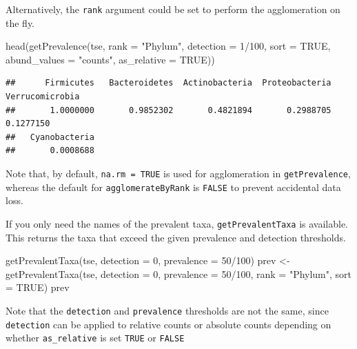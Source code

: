 \documentclass[
]{book}
\newenvironment{Shaded}{\begin{snugshade}}{\end{snugshade}}
\newcommand{\AttributeTok}[1]{\textcolor[rgb]{0.77,0.63,0.00}{#1}}
\newcommand{\ConstantTok}[1]{\textcolor[rgb]{0.00,0.00,0.00}{#1}}
\newcommand{\DecValTok}[1]{\textcolor[rgb]{0.00,0.00,0.81}{#1}}
\newcommand{\FunctionTok}[1]{\textcolor[rgb]{0.00,0.00,0.00}{#1}}
\newcommand{\NormalTok}[1]{#1}
\newcommand{\OtherTok}[1]{\textcolor[rgb]{0.56,0.35,0.01}{#1}}
\newcommand{\SpecialCharTok}[1]{\textcolor[rgb]{0.00,0.00,0.00}{#1}}
\newcommand{\StringTok}[1]{\textcolor[rgb]{0.31,0.60,0.02}{#1}}
\begin{document}
Alternatively, the \texttt{rank} argument could be set to perform the agglomeration on
the fly.

\begin{Shaded}
\begin{Highlighting}[]
\FunctionTok{head}\NormalTok{(}\FunctionTok{getPrevalence}\NormalTok{(tse, }\AttributeTok{rank =} \StringTok{"Phylum"}\NormalTok{, }\AttributeTok{detection =} \DecValTok{1}\SpecialCharTok{/}\DecValTok{100}\NormalTok{, }\AttributeTok{sort =} \ConstantTok{TRUE}\NormalTok{,}
                   \AttributeTok{abund\_values =} \StringTok{"counts"}\NormalTok{, }\AttributeTok{as\_relative =} \ConstantTok{TRUE}\NormalTok{))}
\end{Highlighting}
\end{Shaded}

\begin{verbatim}
##      Firmicutes   Bacteroidetes  Actinobacteria  Proteobacteria Verrucomicrobia 
##       1.0000000       0.9852302       0.4821894       0.2988705       0.1277150 
##   Cyanobacteria 
##       0.0008688
\end{verbatim}

Note that, by default, \texttt{na.rm\ =\ TRUE} is used for agglomeration in
\texttt{getPrevalence}, whereas the default for \texttt{agglomerateByRank} is
\texttt{FALSE} to prevent accidental data loss.

If you only need the names of the prevalent taxa, \texttt{getPrevalentTaxa}
is available. This returns the taxa that exceed the given prevalence
and detection thresholds.

\begin{Shaded}
\begin{Highlighting}[]
\FunctionTok{getPrevalentTaxa}\NormalTok{(tse, }\AttributeTok{detection =} \DecValTok{0}\NormalTok{, }\AttributeTok{prevalence =} \DecValTok{50}\SpecialCharTok{/}\DecValTok{100}\NormalTok{)}
\NormalTok{prev }\OtherTok{\textless{}{-}} \FunctionTok{getPrevalentTaxa}\NormalTok{(tse, }\AttributeTok{detection =} \DecValTok{0}\NormalTok{, }\AttributeTok{prevalence =} \DecValTok{50}\SpecialCharTok{/}\DecValTok{100}\NormalTok{,}
                         \AttributeTok{rank =} \StringTok{"Phylum"}\NormalTok{, }\AttributeTok{sort =} \ConstantTok{TRUE}\NormalTok{)}
\NormalTok{prev}
\end{Highlighting}
\end{Shaded}

Note that the \texttt{detection} and \texttt{prevalence} thresholds are not the same, since
\texttt{detection} can be applied to relative counts or absolute counts depending on
whether \texttt{as\_relative} is set \texttt{TRUE} or \texttt{FALSE}
\end{document}
